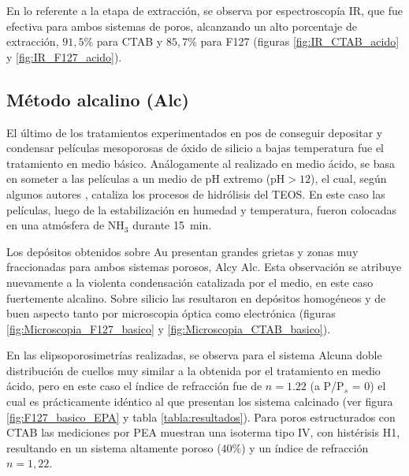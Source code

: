 		 \pagebreak En lo referente a la etapa de extracción, se observa por espectroscopía IR, que fue efectiva para ambos sistemas de poros, alcanzando un alto porcentaje de extracción, $91,5$\% para CTAB y $85,7$\% para F127 (figuras \ref{fig:IR_CTAB_acido} y \ref{fig:IR_F127_acido}).  	
				
	 \subsection{Método alcalino (Alc)}

	 	 El último de los tratamientos experimentados en pos de conseguir depositar y condensar películas mesoporosas de óxido de silicio a bajas temperatura fue el tratamiento en medio básico. Análogamente al realizado en medio ácido, se basa en someter a las películas a un medio de pH extremo (pH$>12$), el cual, según algunos autores \cite{Soler-Illia2011,Huo1996,Ichinose2002,GonzalezSolveyra2017}, cataliza los procesos de hidrólisis del TEOS. En este caso las películas, luego de la estabilización en humedad y temperatura, fueron colocadas en una atmósfera de NH$_3$ durante \SI{15}{\minute}. 

		 Los depósitos obtenidos sobre Au presentan grandes grietas y zonas muy fraccionadas para ambos sistemas porosos, Alc\pdmF\space y Alc\pdmC. Esta observación se atribuye nuevamente a la violenta condensación catalizada por el medio, en este caso fuertemente alcalino. Sobre silicio las \pdm\space resultaron en depósitos homogéneos y de buen aspecto tanto por microscopia óptica como electrónica (figuras \ref{fig:Microscopia_F127_basico} y \ref{fig:Microscopia_CTAB_basico}).

		 En las elipsoporosimetrías realizadas, se observa para el sistema Alc\pdmF\space una doble distribución de cuellos muy similar a la obtenida por el tratamiento en medio ácido, pero en este caso el índice de refracción fue de $n=1.22$ (a P/P$_s$ = 0) el cual es prácticamente idéntico al que presentan los sistema calcinado (ver figura \ref{fig:F127_basico_EPA} y tabla \ref{tabla:resultados}). Para poros estructurados con CTAB las mediciones por PEA muestran una isoterma tipo IV, con histérisis H1, resultando en un sistema altamente poroso ($40\%$) y un índice de refracción $n=1,22$.
	
